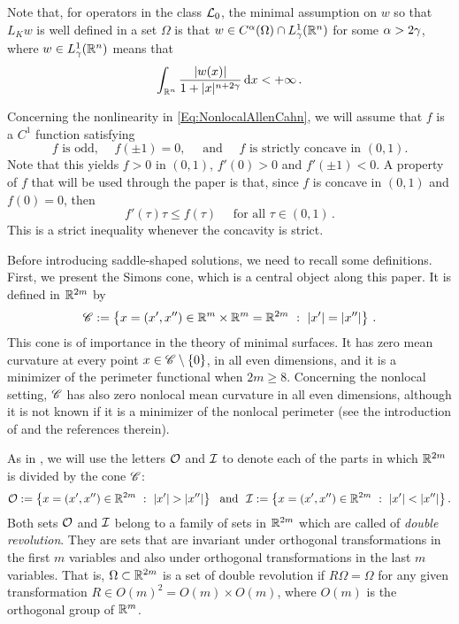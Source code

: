 Note that, for operators in the class $\mathcal{L}_0$, the minimal assumption on $w$ so that $L_K w$ is well defined in a set $\Omega$ is that $w\in C^\alpha (\Omega)\cap L^1_\gamma(\mathbb{R}^n)$ for some $\alpha > 2\gamma$, where $w\in L^1_\gamma(\mathbb{R}^n)$ means that
$$
\int_{\mathbb{R}^n} \dfrac{|w(x)|}{1+|x|^{n+2\gamma}}\,\mathrm{d} x < +\infty\,.
$$


Concerning the nonlinearity in \eqref{Eq:NonlocalAllenCahn}, we will assume that $f$ is a $C^1$ function satisfying
\begin{equation}
\label{Eq:Hypothesesf}
f \textrm{ is odd, } \quad f(\pm 1)=0, \quad \text{ and } \quad f \textrm{ is strictly concave in }  (0,1).
\end{equation}
Note that this yields $f>0$ in $(0,1)$, $f'(0)>0$ and $f'(\pm 1) < 0$. A property of $f$ that will be used through the paper is that, since $f$ is concave in $(0,1)$ and $f(0)=0$, then 
\begin{equation}
\label{Eq:PropertyConcavityf}
f'(\tau)\tau \leq f(\tau) \quad \textrm{ for all } \tau \in (0,1)\,.
\end{equation}
This is a strict inequality whenever the concavity is strict.

Before introducing saddle-shaped solutions, we need to recall some definitions. First, we present the Simons cone, which is a central object along this paper. It is defined in $\mathbb{R}^{2m}$ by
$$
\mathscr{C} := \left \{ x = (x', x'') \in \mathbb{R}^m \times \mathbb{R}^m = \mathbb{R}^{2m} \ : \ |x'| = |x''| \right \}\,.
$$
This cone is of importance in the theory of minimal surfaces. It has zero mean curvature at every point $x\in \mathscr{C} \setminus \{0\}$, in all even dimensions, and it is a minimizer of the perimeter functional when $2m\geq 8$. Concerning the nonlocal setting, $\mathscr{C}$ has also zero nonlocal mean curvature in all even dimensions, although it is not known if it is a minimizer of the nonlocal perimeter (see the introduction of \cite{Felipe-Sanz-Perela:SaddleFractional} and the references therein).


As in \cite{FelipeSanz-Perela:IntegroDifferentialI}, we will use the letters $\mathcal{O}$ and $\mathcal{I}$ to denote each of the parts in which $\mathbb{R}^{2m}$ is divided by the cone $\mathscr{C}$:
$$
\mathcal{O}:= \left \{ x = (x', x'') \in \mathbb{R}^{2m} \ : \ |x'| > |x''| \right \} \ \textrm{ and } \
\mathcal{I}:= \left \{ x = (x', x'') \in \mathbb{R}^{2m} \ : \ |x'| < |x''| \right \}.
$$
Both sets $\mathcal{O}$ and $\mathcal{I}$ belong to a family of sets in $\mathbb{R}^{2m}$ which are called of \emph{double revolution}. They are sets that are invariant under orthogonal transformations in the first $m$ variables and also under orthogonal transformations in the last $m$ variables. That is, $\Omega\subset \mathbb{R}^{2m}$ is a set of double revolution if $R\Omega = \Omega$ for any given transformation $R\in O(m)^2 = O(m) \times O(m)$, where  $O(m)$ is the orthogonal group of $\mathbb{R}^m$.

